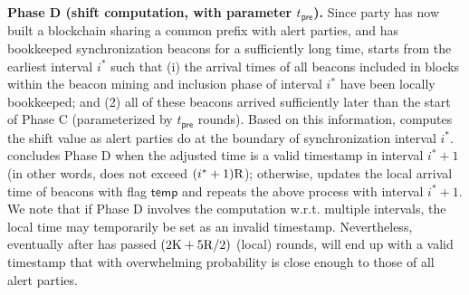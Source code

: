 \begin{cccItemize}[nosep]
      \item \textbf{Phase D (shift computation, with parameter $t_{\mathsf{pre}}$).}
      Since party \party has now built a blockchain sharing a common prefix with alert parties, and has bookkeeped synchronization beacons for a sufficiently long time, \party starts from the earliest interval $i^*$ such that (i) the arrival times of all beacons included in blocks within the beacon mining and inclusion phase of interval $i^*$ have been locally bookkeeped; and (2) all of these beacons arrived sufficiently later than the start of Phase C (parameterized by $t_{\mathsf{pre}}$ rounds).
      Based on this information, \party computes the shift value as alert parties do at the boundary of synchronization interval $i^*$.
      \party concludes Phase D when the adjusted time is a valid timestamp in interval $i^* + 1$ (in other words, \round does not exceed $(i^* + 1) \mathrm{R}$); otherwise, \party updates the local arrival time of beacons with flag $\mathsf{temp}$ and repeats the above process with interval $i^* + 1$.
      We note that if Phase D involves the computation w.r.t. multiple intervals, the local time may temporarily be set as an invalid timestamp.
      Nevertheless, eventually after \party has passed $(2\mathrm{K} + 5\mathrm{R} / 2)$ (local) rounds, \party will end up with a valid timestamp that with overwhelming probability is close enough to those of all alert parties.
\end{cccItemize}